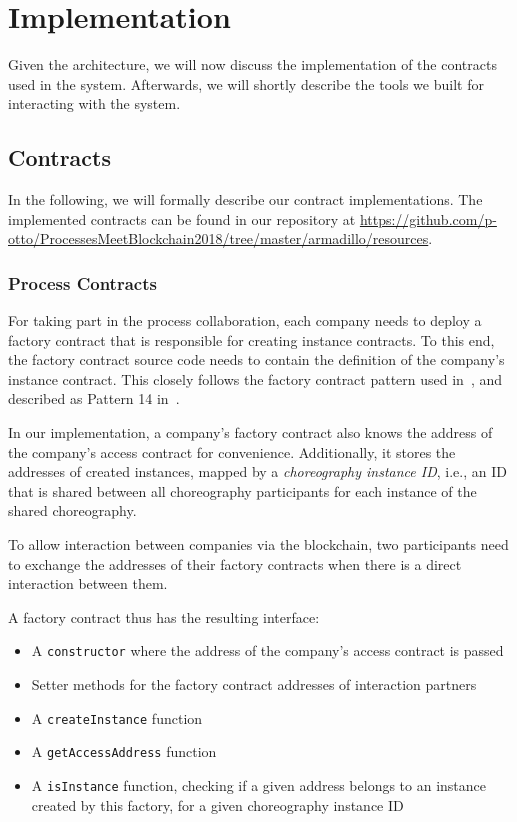 \documentclass[runningheads]{llncs}
\begin{document}
\section{Implementation} \label{implementation}

Given the architecture, we will now discuss the implementation of the contracts used in the system.
Afterwards, we will shortly describe the tools we built for interacting with the system.

\subsection{Contracts}

In the following, we will formally describe our contract implementations.
The implemented contracts can be found in our repository at \url{https://github.com/p-otto/ProcessesMeetBlockchain2018/tree/master/armadillo/resources}.

\subsubsection{Process Contracts}

For taking part in the process collaboration, each company needs to deploy a factory contract that is responsible for creating instance contracts.
To this end, the factory contract source code needs to contain the definition of the company's instance contract.
This closely follows the factory contract pattern used in~\cite{weber2016untrusted}, and described as Pattern 14 in~\cite{xu2018pattern}.

In our implementation, a company's factory contract also knows the address of the company's access contract for convenience.
Additionally, it stores the addresses of created instances, mapped by a \emph{choreography instance ID}, i.e., an ID that is shared between all choreography participants for each instance of the shared choreography.

To allow interaction between companies via the blockchain, two participants need to exchange the addresses of their factory contracts when there is a direct interaction between them.

A factory contract thus has the resulting interface:
\begin{itemize}
	\item A \texttt{constructor} where the address of the company's access contract is passed
	\item Setter methods for the factory contract addresses of interaction partners
	\item A \texttt{createInstance} function
	\item A \texttt{getAccessAddress} function
	\item A \texttt{isInstance} function, checking if a given address belongs to an instance created by this factory, for a given choreography instance ID %
\end{itemize}
\end{document}
